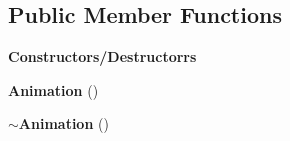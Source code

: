 \subsection*{Public Member Functions}
\begin{Indent}\textbf{ Constructors/\+Destructorrs}\par
\begin{DoxyCompactItemize}
\item 
\mbox{\label{classrev_1_1_animation_aef1f58a3ddf40f0baa0d27a7ebf455f5}} 
{\bfseries Animation} ()
\item 
\mbox{\label{classrev_1_1_animation_a99746b21a9eb899e4c7fd6eec2c18b38}} 
{\bfseries $\sim$\+Animation} ()
\end{DoxyCompactItemize}
\end{Indent}

